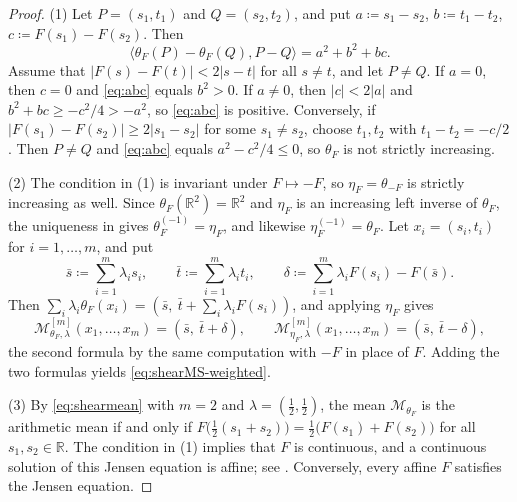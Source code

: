 \documentclass[a4paper, reqno, 11pt]{amsart}
\theoremstyle{definition}
\begin{document}
\begin{proof}
(1) Let $P = (s_1, t_1)$ and $Q = (s_2, t_2)$, and put $a \coloneqq  s_1 - s_2$, $b \coloneqq  t_1 - t_2$, $c \coloneqq  F(s_1) - F(s_2)$.
Then
\begin{equation}\label{eq:abc}
\langle \theta_F(P) - \theta_F(Q), P - Q \rangle = a^2 + b^2 + bc .
\end{equation}
Assume that $|F(s) - F(t)| < 2|s-t|$ for all $s \neq t$, and let $P \neq Q$.
If $a = 0$, then $c = 0$ and \eqref{eq:abc} equals $b^2 > 0$.
If $a \neq 0$, then $|c| < 2|a|$ and $b^2 + bc \ge  -c^2/4 > -a^2$, so \eqref{eq:abc} is positive.
Conversely, if $|F(s_1) - F(s_2)| \ge  2|s_1 - s_2|$ for some $s_1 \neq s_2$, choose $t_1, t_2$ with $t_1 - t_2 = -c/2$.
Then $P \neq Q$ and \eqref{eq:abc} equals $a^2 - c^2/4 \le 0$, so $\theta_F$ is not strictly increasing.

(2) The condition in (1) is invariant under $F \mapsto -F$, so $\eta_F = \theta_{-F}$ is strictly increasing as well.
Since $\theta_F(\mathbb{R}^2) = \mathbb{R}^2$ and $\eta_F$ is an increasing left inverse of $\theta_F$, the uniqueness in \cite[Theorem 2]{Toth} gives $\theta_F^{(-1)} = \eta_F$, and likewise $\eta_F^{(-1)} = \theta_F$.
Let $x_i = (s_i, t_i)$ for $i = 1, \dots, m$, and put
\begin{equation*}
\bar{s} \coloneqq  \sum_{i=1}^m \lambda_i s_i, \qquad \bar{t} \coloneqq  \sum_{i=1}^m \lambda_i t_i, \qquad \delta \coloneqq  \sum_{i=1}^m \lambda_i F(s_i) - F(\bar{s}) .
\end{equation*}
Then $\sum_i \lambda_i \theta_F(x_i) = \left( \bar{s}, \ \bar{t} + \sum_i \lambda_i F(s_i) \right)$, and applying $\eta_F$ gives
\begin{equation}\label{eq:shearmean}
\mathcal{M}^{[m]}_{\theta_F,\lambda}(x_1, \dots, x_m) = (\bar{s}, \ \bar{t} + \delta), \qquad
\mathcal{M}^{[m]}_{\eta_F,\lambda}(x_1, \dots, x_m) = (\bar{s}, \ \bar{t} - \delta),
\end{equation}
the second formula by the same computation with $-F$ in place of $F$.
Adding the two formulas yields \eqref{eq:shearMS-weighted}.

(3) By \eqref{eq:shearmean} with $m = 2$ and $\lambda = (\tfrac{1}{2},\tfrac{1}{2})$, the mean $\mathcal{M}_{\theta_F}$ is the arithmetic mean if and only if
$F\big( \tfrac{1}{2}(s_1 + s_2) \big) = \tfrac{1}{2}\big( F(s_1) + F(s_2) \big)$ for all $s_1, s_2 \in \mathbb{R}$.
The condition in (1) implies that $F$ is continuous, and a continuous solution of this Jensen equation is affine; see \cite[Section 13.2]{Kuczma}.
Conversely, every affine $F$ satisfies the Jensen equation.
\end{proof}
\end{document}
